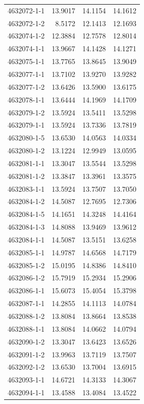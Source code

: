 \begin{longtable}{lrrr}
4632072-1-1 & 13.9017 & 14.1154 & 14.1612 \\
4632072-1-2 & 8.5172 & 12.1413 & 12.1693 \\
4632074-1-2 & 12.3884 & 12.7578 & 12.8014 \\
4632074-1-1 & 13.9667 & 14.1428 & 14.1271 \\
4632075-1-1 & 13.7765 & 13.8645 & 13.9049 \\
4632077-1-1 & 13.7102 & 13.9270 & 13.9282 \\
4632077-1-2 & 13.6426 & 13.5900 & 13.6175 \\
4632078-1-1 & 13.6444 & 14.1969 & 14.1709 \\
4632079-1-2 & 13.5924 & 13.5411 & 13.5298 \\
4632079-1-1 & 13.5924 & 13.7336 & 13.7819 \\
4632080-1-5 & 13.6530 & 14.0563 & 14.0334 \\
4632080-1-2 & 13.1224 & 12.9949 & 13.0595 \\
4632081-1-1 & 13.3047 & 13.5544 & 13.5298 \\
4632081-1-2 & 13.3847 & 13.3961 & 13.3575 \\
4632083-1-1 & 13.5924 & 13.7507 & 13.7050 \\
4632084-1-2 & 14.5087 & 12.7695 & 12.7306 \\
4632084-1-5 & 14.1651 & 14.3248 & 14.4164 \\
4632084-1-3 & 14.8088 & 13.9469 & 13.9612 \\
4632084-1-1 & 14.5087 & 13.5151 & 13.6258 \\
4632085-1-1 & 14.9787 & 14.6568 & 14.7179 \\
4632085-1-2 & 15.0195 & 14.8386 & 14.8410 \\
4632086-1-2 & 15.7919 & 15.2934 & 15.2906 \\
4632086-1-1 & 15.6073 & 15.4054 & 15.3798 \\
4632087-1-1 & 14.2855 & 14.1113 & 14.0784 \\
4632088-1-2 & 13.8084 & 13.8664 & 13.8538 \\
4632088-1-1 & 13.8084 & 14.0662 & 14.0794 \\
4632090-1-2 & 13.3047 & 13.6423 & 13.6526 \\
4632091-1-2 & 13.9963 & 13.7119 & 13.7507 \\
4632092-1-2 & 13.6530 & 13.7004 & 13.6915 \\
4632093-1-1 & 14.6721 & 14.3133 & 14.3067 \\
4632094-1-1 & 13.4588 & 13.4084 & 13.4522 \\

\end{longtable}
